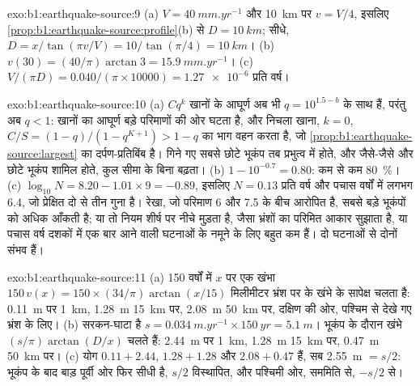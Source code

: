 \begin{solution}{exo:b1:earthquake-source:9}
(a) $V = \qty{40}{mm.yr^{-1}}$ और \qty{10}{km} पर $v = V/4$, इसलिए
\cref{prop:b1:earthquake-source:profile}(b) से $D = \qty{10}{km}$; सीधे,
$D = x/\tan(\pi v/V) = 10/\tan(\pi/4) = \qty{10}{km}$। (b) $v(30) =
(40/\pi)\arctan 3 = \qty{15.9}{mm.yr^{-1}}$। (c) $V/(\pi D) =
\num{0.040}/(\pi\times\num{10000}) = \num{1.27e-6}$ प्रति वर्ष।
\end{solution}

\begin{solution}{exo:b1:earthquake-source:10}
(a) $C q^k$ खानों के आघूर्ण अब भी $q = 10^{1.5 - b}$ के साथ हैं, परंतु अब
$q < 1$: खानों का आघूर्ण बड़े परिमाणों की ओर घटता है, और
निचला खाना, $k = 0$, $C/S = (1 - q)/(1 - q^{K+1}) > 1 - q$ का भाग वहन करता है, जो
\cref{prop:b1:earthquake-source:largest} का दर्पण-प्रतिबिंब है। गिने गए सबसे छोटे
भूकंप तब प्रभुत्व में होते, और जैसे-जैसे और छोटे भूकंप शामिल होते, कुल सीमा के बिना बढ़ता।
(b) $1 - 10^{-0.7} = 0.80$: कम से कम \qty{80}{\percent}। (c) $\log_{10}N = 8.20 - 1.01\times9 = -0.89$, इसलिए $N = 0.13$
प्रति वर्ष और पचास वर्षों में लगभग 6.4, जो प्रेक्षित दो से तीन गुना है। रेखा, जो परिमाण 6 और 7.5 के बीच आरोपित है, सबसे बड़े भूकंपों को अधिक आँकती है;
या तो नियम शीर्ष पर नीचे मुड़ता है, जैसा भ्रंशों का परिमित आकार सुझाता है, या पचास वर्ष दशकों में एक बार आने वाली घटनाओं के नमूने के लिए बहुत कम हैं। दो घटनाओं से दोनों संभव हैं।
\end{solution}

\begin{solution}{exo:b1:earthquake-source:11}
(a) 150 वर्षों में $x$ पर एक खंभा $150\,v(x) = 150\times(34/\pi)
\arctan(x/15)$ मिलीमीटर भ्रंश पर के खंभे के सापेक्ष चलता है: \qty{0.11}{m} पर
\qty{1}{km}, \qty{1.28}{m} \qty{15}{km} पर, \qty{2.08}{m} \qty{50}{km} पर,
दक्षिण की ओर, पश्चिम से देखे गए  भ्रंश के लिए। (b) सरकन-घाटा है
$s = \qty{0.034}{m.yr^{-1}}\times\qty{150}{yr} = \qty{5.1}{m}$। भूकंप के दौरान खंभे $(s/\pi)\arctan(D/x)$ चलते हैं: \qty{2.44}{m} पर
\qty{1}{km}, \qty{1.28}{m} \qty{15}{km} पर, \qty{0.47}{m} \qty{50}{km} पर।
(c) योग $0.11 + 2.44$, $1.28 + 1.28$ और $2.08 + 0.47$ हैं, सब
\qty{2.55}{m} $= s/2$: भूकंप के बाद बाड़ पूर्वी ओर फिर सीधी है, $s/2$ विस्थापित, और पश्चिमी ओर, सममिति से, $-s/2$ से।
\end{solution}

